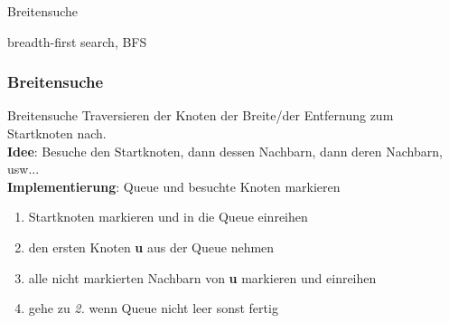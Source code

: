 \begin{frame}
    \Huge Breitensuche

\Large breadth-first search, BFS
\end{frame}
\begin{frame}
    \frametitle{Breitensuche}
    \begin{KITinfoblock}{Breitensuche}
        Traversieren der Knoten der Breite/der Entfernung zum Startknoten nach.\\[0.7em]
        \textbf{Idee}: Besuche den Startknoten, dann dessen Nachbarn, dann deren Nachbarn, usw...\\[0.7em]
        \textbf{Implementierung}: Queue und besuchte Knoten markieren
        \begin{enumerate}
            \item Startknoten markieren und in die Queue einreihen
            \item den ersten Knoten \textbf{u} aus der Queue nehmen
            \item alle nicht markierten Nachbarn von \textbf{u} markieren und einreihen
            \item gehe zu \textit{2.} wenn Queue nicht leer sonst fertig
        \end{enumerate}
    \end{KITinfoblock}
\end{frame}


